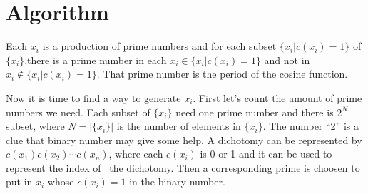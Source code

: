 \documentclass{article}
\newcommand{\nin}{\not\in}
\begin{document}
\section{Algorithm}

Each $x_{i}$ is a production of prime numbers and for each subset $\{ x_{i} |c
( x_{i} ) =1 \}$ of $\{ x_{i} \}$,there is a prime number in each $x_{i} \in
\{ x_{i} |c ( x_{i} ) =1 \}$ and not in $x_{i} \nin \{ x_{i} |c ( x_{i} ) =1
\}$. That prime number is the period of the cosine function.

Now it is time to find a way to generate $x_{i}$. First let's count the amount
of prime numbers we need. Each subset of $\{ x_{i} \}$ need one prime number
and there is $2^{N}$ subset, where $N= | \{ x_{i} \} |$ is the number of
elements in $\{ x_{i} \}$. The number ``2'' is a clue that binary number may
give some help. A dichotomy can be represented by $c ( x_{1} ) c ( x_{2} )
\cdots c ( x_{n} )$, where each $c ( x_{i} )$ is 0 or 1 and it can be used to
represent the index of \ the dichotomy. Then a corresponding prime is choosen
to put in $x_{i}$ whose $c ( x_{i} ) =1$ in the binary number.
\end{document}
